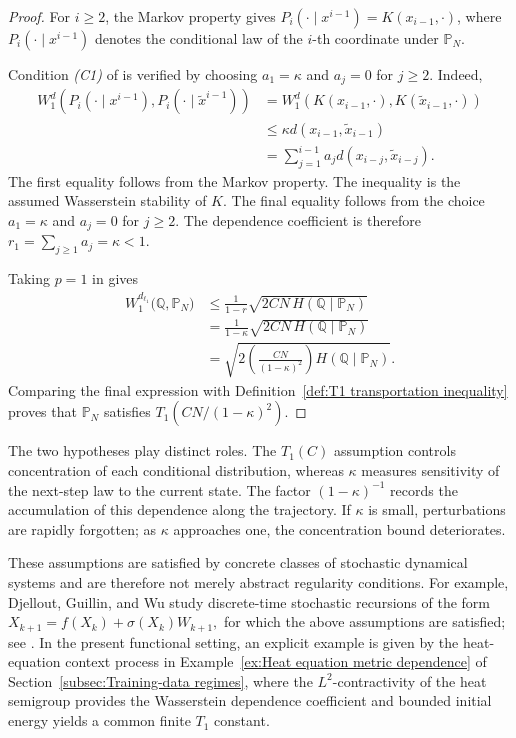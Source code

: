 \begin{proof}
For \(i\geq2\), the Markov property gives \(P_i(\cdot\mid x^{i-1})=K(x_{i-1},\cdot)\), where \(P_i(\cdot\mid x^{i-1})\) denotes the conditional law of the \(i\)-th coordinate under \(\mathbb P_N\).

Condition \emph{(C1)} of \cite[Theorem~2.5]{DjelloutGuillinWu2004} is verified by choosing \(a_1=\kappa\) and \(a_j=0\) for \(j\geq2\). Indeed,
\[
\begin{aligned}
W_1^d
\left(
P_i(\cdot\mid x^{i-1}),
P_i(\cdot\mid\widetilde x^{i-1})
\right)
&=
W_1^d
\left(
K(x_{i-1},\cdot),
K(\widetilde x_{i-1},\cdot)
\right)
\\
&\leqslant
\kappa
d(x_{i-1},\widetilde x_{i-1})
\\
&=
\sum_{j=1}^{i-1}
a_j
d(x_{i-j},\widetilde x_{i-j}).
\end{aligned}
\]
The first equality follows from the Markov property. The inequality is the assumed Wasserstein stability of \(K\). The final equality follows from the choice \(a_1=\kappa\) and \(a_j=0\) for \(j\geq2\). The dependence coefficient is therefore \(r_1=\sum_{j\geq1}a_j=\kappa<1\).

Taking \(p=1\) in \cite[Theorem~2.5]{DjelloutGuillinWu2004} gives
\[
\begin{aligned}
W_1^{d_{\ell_1}}
\bigl(
\mathbb Q,
\mathbb P_N
\bigr)
&\leqslant
\frac{1}{1-r}
\sqrt{
2CN\,H(\mathbb Q\mid\mathbb P_N)
}
\\
&=
\frac{1}{1-\kappa}
\sqrt{
2CN\,H(\mathbb Q\mid\mathbb P_N)
}
\\
&=
\sqrt{
2
\left(
\frac{CN}{(1-\kappa)^2}
\right)
H(\mathbb Q\mid\mathbb P_N)
}.
\end{aligned}
\]
Comparing the final expression with Definition~\ref{def:T1 transportation inequality} proves that \(\mathbb P_N\) satisfies \(T_1(CN/(1-\kappa)^2)\).
\end{proof}

The two hypotheses play distinct roles. The \(T_1(C)\) assumption controls concentration of each conditional distribution, whereas \(\kappa\) measures sensitivity of the next-step law to the current state. The factor \((1-\kappa)^{-1}\) records the accumulation of this dependence along the trajectory. If \(\kappa\) is small, perturbations are rapidly forgotten; as \(\kappa\) approaches one, the concentration bound deteriorates.

These assumptions are satisfied by concrete classes of stochastic dynamical systems and are therefore not merely abstract regularity conditions. For example, Djellout, Guillin, and Wu study discrete-time stochastic recursions of the form
\(
X_{k+1}=f(X_k)+\sigma(X_k)W_{k+1},
\)
for which the above assumptions are satisfied; see \cite[Section~3.2, Corollary~3.5]{DjelloutGuillinWu2004}. In the present functional setting, an explicit example is given by the heat-equation context process in Example~\ref{ex:Heat equation metric dependence} of Section~\ref{subsec:Training-data regimes}, where the \(L^2\)-contractivity of the heat semigroup provides the Wasserstein dependence coefficient and bounded initial energy yields a common finite \(T_1\) constant.

